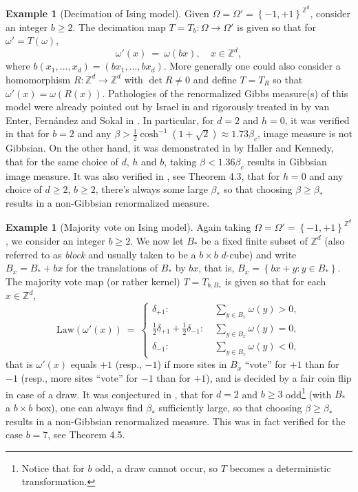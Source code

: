 \documentclass[12pt]{article}
\newcommand{\Z}{\mathbb{Z}}
\newcommand{\set}[1]{\left\{#1\right\}}
\newcommand{\ra}{\rightarrow}
\newcommand{\1}{\mathbbm{1}}
\newcommand{\5}{\vspace{0.5cm}}
\theoremstyle{definition}
\newtheorem{ex}[thm]{Example}
\begin{document}
\begin{ex}[Decimation of Ising model]
Given $\Omega=\Omega'=\set{-1,+1}^{\Z^d}$, consider an integer $b\geq 2$. The decimation map $T=T_b:\Omega\ra\Omega'$ is given so that for $\omega'=T(\omega)$,
$$\omega'(x) ~=~ \omega(bx), \quad x\in\Z^d,$$
where $b(x_1,\ldots,x_d)=(bx_1,\ldots,bx_d)$. More generally one could also consider a homomorphism $R:\Z^d\ra\Z^d$ with $\det R\neq 0$ and define $T=T_R$ so that $\omega'(x)=\omega(R(x))$. Pathologies of the renormalized Gibbs measure(s) of  this model were already pointed out by Israel in \cite{Isr} and rigorously treated in by van Enter, Fern\'andez and Sokal in \cite{EFS}. In particular, for $d=2$ and $h=0$, it was verified in \cite{EFS} that for $b=2$ and any $\beta>\frac{1}{2}\cosh^{-1}(1+\sqrt{2})\approx 1.73\beta_c$, image measure is not Gibbsian. On the other hand, it was demonstrated in \cite{HK} by Haller and Kennedy, that for the same choice of $d$, $h$ and $b$, taking $\beta<1.36\beta_c$ results in Gibbsian image measure. It was also verified in \cite{EFS}, see Theorem 4.3, that for $h=0$ and any choice of $d\geq 2$, $b\geq 2$, there's always some large $\beta_*$ so that choosing $\beta\geq \beta_*$ results in a non-Gibbsian renormalized measure.
\end{ex}

\begin{ex}[Majority vote on Ising model]
Again taking $\Omega=\Omega'=\set{-1,+1}^{\Z^d}$, we consider an integer $b\geq 2$. We now let $B_*$ be a fixed finite subset of $\Z^d$ (also referred to as \textit{block} and usually taken to be a $b\times b$ $d$-cube) and write $B_x=B_*+bx$ for the translations of $B_*$ by $bx$, that is, $B_x=\set{bx+y:y\in B_*}$. The majority vote map (or rather kernel) $T=T_{b,B_*}$ is given so that for each $x\in\Z^d$,
$$\mathrm{Law}(\omega'(x)) ~=~ \begin{cases}
\delta_{+1}: ~&\sum_{y\in B_x}\omega(y)>0, \\
\frac{1}{2}\delta_{+1}+\frac{1}{2}\delta_{-1}: ~&\sum_{y\in B_x}\omega(y)=0, \\
\delta_{-1}: ~&\sum_{y\in B_x}\omega(y)<0,
\end{cases}$$
that is $\omega'(x)$ equals $+1$ (resp., $-1$) if more sites in $B_x$ ``vote'' for $+1$ than for $-1$ (resp., more sites ``vote'' for $-1$ than for $+1$), and is decided by a fair coin flip in case of a draw. It was conjectured in \cite{EFS}, that for $d=2$ and $b\geq 3$ odd\footnote{Notice that for $b$ odd, a draw cannot occur, so $T$ becomes a deterministic transformation.} (with $B_*$ a $b\times b$ box), one can always find $\beta_*$ sufficiently large, so that choosing $\beta\geq\beta_*$ results in a non-Gibbsian renormalized measure. This was in fact verified for the case $b=7$, see Theorem 4.5. 
\end{ex}
\end{document}
